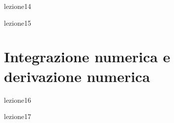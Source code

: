 \documentclass[12pt,a4paper,headings=optiontohead]{scrbook}
\begin{document}
\newpage
{lezione14}


\newpage
{lezione15}


\newpage

\chapter{Integrazione numerica e derivazione numerica}

{lezione16}


\newpage
{lezione17}
\end{document}
